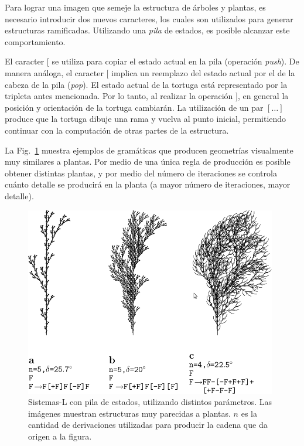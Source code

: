 Para lograr una imagen que semeje la estructura de árboles y plantas, es necesario introducir dos nuevos caracteres, los cuales son utilizados para generar estructuras ramificadas.
Utilizando una {\em pila} de estados, es posible alcanzar este comportamiento.

El caracter $[$ se utiliza para copiar el estado actual en la pila (operación {\em push}).
De manera análoga, el caracter $[$ implica un reemplazo del estado actual por el de la cabeza de la pila ({\em pop}).
El estado actual de la tortuga está representado por la tripleta antes mencionada.
Por lo tanto, al realizar la operación $]$, en general la posición y orientación de la tortuga cambiarán.
La utilización de un par $[\dots]$ produce que la tortuga dibuje una rama y vuelva al punto inicial, permitiendo continuar con la computación de otras partes de la estructura.

La Fig.~\ref{fg:sistemasLcorchete} muestra ejemplos de gramáticas que producen geometrías visualmente muy similares a plantas.
Por medio de una única regla de producción es posible obtener distintas plantas, y por medio del número de iteraciones se controla cuánto detalle se producirá en la planta (a mayor número de iteraciones, mayor detalle).

\begin{figure}
\center
\includegraphics[width=11cm]{figures/sistemalcorchete}
\caption[Sistemas-L con pila de estados, utilizando distintos parámetros]{Sistemas-L con pila de estados, utilizando distintos parámetros. Las imágenes muestran estructuras muy parecidas a plantas. $n$ es la cantidad de derivaciones utilizadas para producir la cadena que da origen a la figura.}
\label{fg:sistemasLcorchete}
\end{figure}


